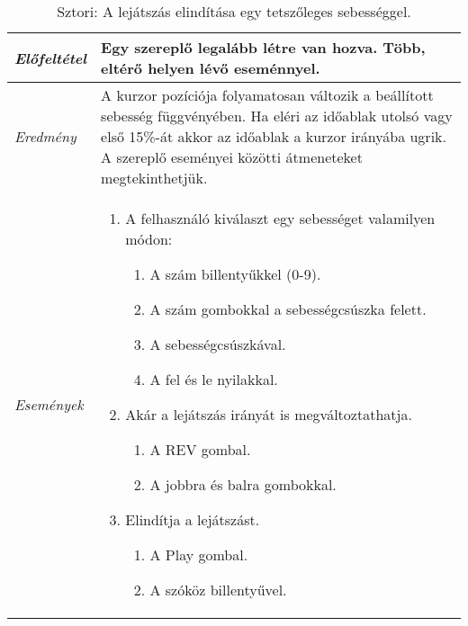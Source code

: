 \begin{table}[H]
	\centering
	\begin{tabular}{ | m{} | m{} | }
		\hline
		\emph{Előfeltétel} & Egy szereplő legalább létre van hozva. Több, eltérő helyen lévő eseménnyel. \\
		\hline
		\emph{Eredmény} & A kurzor pozíciója folyamatosan változik a beállított sebesség függvényében. Ha eléri az időablak utolsó vagy első 15\%-át akkor az időablak a kurzor irányába ugrik. A szereplő eseményei közötti átmeneteket megtekinthetjük. \\
		\hline
		\hline
		\emph{Események} &
		\begin{enumerate}[itemsep=-1ex]
			\item A felhasználó kiválaszt egy sebességet valamilyen módon:
			\begin{enumerate}[itemsep=-1ex]
				\item A szám billentyűkkel (0-9).
				\item A szám gombokkal a sebességcsúszka felett.
				\item A sebességcsúszkával.
				\item A fel és le nyilakkal.
			\end{enumerate}
			\item Akár a lejátszás irányát is megváltoztathatja.
			\begin{enumerate}[itemsep=-1ex]
				\item A REV gombal.
				\item A jobbra és balra gombokkal.
			\end{enumerate}
			\item Elindítja a lejátszást.
			\begin{enumerate}[itemsep=-1ex]
				\item A Play gombal.
				\item A szóköz billentyűvel.
			\end{enumerate}
		\end{enumerate}
		\\
		\hline
	\end{tabular}
	\caption{Sztori: A lejátszás elindítása egy tetszőleges sebességgel.}
	\label{tab:story-play}
\end{table}
